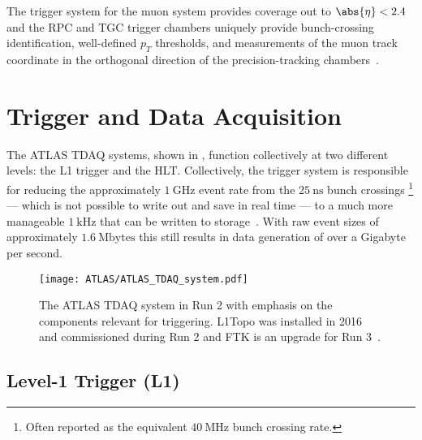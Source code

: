 The trigger system for the muon system provides coverage out to $\abs{\eta} < 2.4$ and the \gls{RPC} and \gls{TGC} trigger chambers uniquely provide bunch-crossing identification, well-defined $p_{T}$ thresholds, and measurements of the muon track coordinate in the orthogonal direction of the precision-tracking chambers~\cite{PERF-2007-01}.

\section{Trigger and Data Acquisition}\label{sec:ATLAS_TDAQ}

The ATLAS \gls{TDAQ} systems, shown in , function collectively at two different levels: the L1 trigger and the \gls{HLT}.
Collectively, the trigger system is responsible for reducing the approximately $1~\mathrm{GHz}$ event rate from the $25~\mathrm{ns}$ bunch crossings%
\footnote{Often reported as the equivalent $40~\mathrm{MHz}$ bunch crossing rate.}
--- which is not possible to write out and save in real time --- to a much more manageable $1~\mathrm{kHz}$ that can be written to storage~\cite{TRIG-2016-01}.
With raw event sizes of approximately $1.6~\mathrm{Mbytes}$ this still results in data generation of over a Gigabyte per second.

\begin{figure}[htbp]
 \centering
 \texttt{[image: ATLAS/ATLAS\_TDAQ\_system.pdf]}
 \caption[The ATLAS \acrlong{TDAQ} system in Run 2 with emphasis on the components relevant for triggering.]{%
  The ATLAS \gls{TDAQ} system in Run 2 with emphasis on the components relevant for triggering.
  L1Topo was installed in 2016 and commissioned during Run 2 and FTK is an upgrade for Run 3~\cite{TRIG-2016-01}.}\label{fig:ATLAS_TDAQ_system}
\end{figure}

\subsection{Level-1 Trigger (L1)}\label{sec:ATLAS_L1_trigger}

